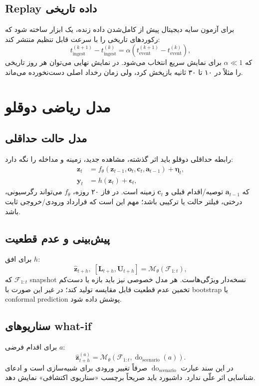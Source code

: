 \documentclass[11pt,a4paper]{article}
\newcommand{\code}[1]{\lr{\texttt{\detokenize{#1}}}}
\begin{document}
\subsection{Replay داده تاریخی}
برای آزمون سایه دیجیتال پیش از کامل‌شدن داده زنده، یک ابزار \code{replay.py} ساخته شود که رکوردهای تاریخی را با سرعت قابل تنظیم منتشر کند:
\begin{equation}
 t_{\mathrm{ingest}}^{(k+1)}-t_{\mathrm{ingest}}^{(k)}=\alpha
\left(t_{\mathrm{event}}^{(k+1)}-t_{\mathrm{event}}^{(k)}\right),
\end{equation}
که $\alpha\ll1$ برای نمایش سریع انتخاب می‌شود. در نمایش نهایی می‌توان هر روز تاریخی را مثلاً در ۱۰ تا ۳۰ ثانیه بازپخش کرد، ولی زمان رخداد اصلی دست‌نخورده می‌ماند.

\section{مدل ریاضی دوقلو}

\subsection{مدل حالت حداقلی}
رابطه حداقلی دوقلو باید اثر گذشته، مشاهده جدید، زمینه و مداخله را نگه دارد:
\begin{align}
\mathbf z_t &= f_{\theta}\left(\mathbf z_{t-1},\mathbf o_t,\mathbf c_t,\mathbf a_{t-1}\right)+\boldsymbol\eta_t,\\
\mathbf y_t &= h\left(\mathbf z_t\right)+\boldsymbol\epsilon_t,
\end{align}
که $\mathbf a_{t-1}$ توصیه/اقدام قبلی و $\mathbf c_t$ زمینه است. در فاز ۲۰ روزه، $f_\theta$ می‌تواند رگرسیونی، درختی، فیلتر حالت یا ترکیبی باشد؛ مهم این است که قرارداد ورودی/خروجی ثابت باشد.

\subsection{پیش‌بینی و عدم قطعیت}
برای افق $h$:
\begin{equation}
\widehat{\mathbf z}_{t+h},\;[\mathbf L_{t+h},\mathbf U_{t+h}]
=\mathcal M_{\theta}(\mathcal F_{1:t}),
\end{equation}
که $\mathcal F_{1:t}$ snapshot نسخه‌دار ویژگی‌هاست. هر مدل خصوصی نیز باید بازه یا دست‌کم تخمین عدم قطعیت قابل مقایسه تولید کند؛ در غیر این صورت با bootstrap یا conformal prediction پوشش داده شود.

\subsection{سناریوهای what-if}
برای اقدام فرضی $a$:
\begin{equation}
\widehat{\mathbf z}^{(a)}_{t+h}=\mathcal M_{\theta}
\left(\mathcal F_{1:t},\operatorname{do}_{\mathrm{scenario}}(a)\right).
\end{equation}
در این سند عبارت $\operatorname{do}_{\mathrm{scenario}}$ صرفاً تغییر ورودی برای شبیه‌سازی است و ادعای شناسایی اثر علّی ندارد. داشبورد باید صریحاً برچسب «سناریوی اکتشافی» نمایش دهد.
\end{document}
